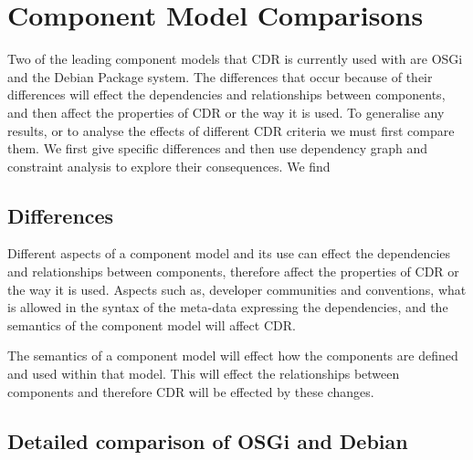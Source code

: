 \chapter{Component Model Comparisons}
\label{comparison}
{}Two of the leading component models that CDR is currently used with are OSGi and the Debian Package system.
{}The differences that occur because of their differences will effect the dependencies and relationships between components,
{}and then affect the properties of CDR or the way it is used.
{}To generalise any results, or to analyse the effects of different CDR criteria we must first compare them.
{}We first give specific differences and then use dependency graph and constraint analysis to explore their consequences.
{}We find %


\section{Differences}
{}Different aspects of a component model and its use can effect the dependencies and relationships between components,
{}therefore affect the properties of CDR or the way it is used.
{}Aspects such as, developer communities and conventions, what is allowed in the syntax of the meta-data expressing the dependencies,
{}and the semantics of the component model will affect CDR.  



	
	

The semantics of a component model will effect how the components are defined and used within that model.
This will effect the relationships between components and therefore CDR will be effected by these changes.

\section{Detailed comparison of OSGi and Debian}


